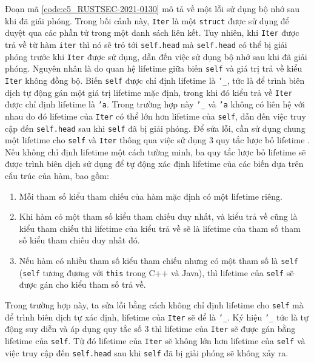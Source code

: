 Đoạn mã \ref{code:c5_RUSTSEC-2021-0130} mô tả về một lỗi sử dụng bộ nhớ sau khi đã giải phóng.
Trong bối cảnh này, \texttt{Iter} là một \texttt{struct} được sử dụng để duyệt qua các phần tử trong một danh sách liên kết.
Tuy nhiên, khi \texttt{Iter} được trả về từ hàm \texttt{iter} thì nó sẽ trỏ tới \texttt{self.head} mà \texttt{self.head} có thể bị giải phóng trước khi \texttt{Iter} được sử dụng, dẫn đến việc sử dụng bộ nhớ sau khi đã giải phóng.
Nguyên nhân là do quan hệ lifetime giữa biến \texttt{self} và giá trị trả về kiểu \texttt{Iter} không đồng bộ.
Biến \texttt{self} được chỉ định lifetime là \texttt{'\_}, tức là để trình biên dịch tự động gán một giá trị lifetime mặc định, trong khi đó kiểu trả về \texttt{Iter} được chỉ định lifetime là \texttt{'a}.
Trong trường hợp này \texttt{'\_} và \texttt{'a} không có liên hệ với nhau do đó lifetime của \texttt{Iter} có thể lớn hơn lifetime của \texttt{self}, dẫn đến việc truy cập đến \texttt{self.head} sau khi \texttt{self} đã bị giải phóng.
Để sửa lỗi, cần sử dụng chung một lifetime cho \texttt{self} và \texttt{Iter} thông qua việc sử dụng 3 quy tắc lược bỏ lifetime \cite{rustlangLifetimeElision}.
Nếu không chỉ định lifetime một cách tường minh, ba quy tắc lược bỏ lifetime sẽ được trình biên dịch sử dụng để tự động xác định lifetime của các biến dựa trên cấu trúc của hàm, bao gồm:

\begin{enumerate}
    \item Mỗi tham số kiểu tham chiếu của hàm mặc định có một lifetime riêng.
    \item Khi hàm có một tham số kiểu tham chiếu duy nhất, và kiểu trả về cũng là kiểu tham chiếu thì lifetime của kiểu trả về sẽ là lifetime của tham số tham số kiểu tham chiếu duy nhất đó.
    \item Nếu hàm có nhiều tham số kiểu tham chiếu nhưng có một tham số là \texttt{self} (\texttt{self} tương đương với \texttt{this} trong C++ và Java), thì lifetime của \texttt{self} sẽ được gán cho kiểu tham số trả về.
\end{enumerate}

Trong trường hợp này, ta sửa lỗi bằng cách không chỉ định lifetime cho \texttt{self} mà để trình biên dịch tự xác định, lifetime của \texttt{Iter} sẽ để là \texttt{'\_}.
Ký hiệu \texttt{'\_} tức là tự động suy diễn và áp dụng quy tắc số 3 thì lifetime của \texttt{Iter} sẽ được gán bằng lifetime của \texttt{self}.
Từ đó lifetime của \texttt{Iter} sẽ không lớn hơn lifetime của \texttt{self} và việc truy cập đến \texttt{self.head} sau khi \texttt{self} đã bị giải phóng sẽ không xảy ra.

